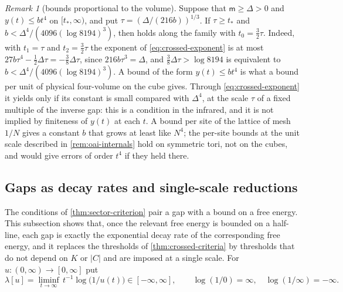 \documentclass[11pt,a4paper]{amsart}
\theoremstyle{definition}
\theoremstyle{remark}
\newtheorem{remark}[theorem]{Remark}
\numberwithin{equation}{section}
\newcommand{\abs}[1]{\lvert #1\rvert}      %
\newcommand{\Mcirc}{\text{\upshape(M$^{\circ}$)}}   %
\newcommand{\tzero}{t_0}                   %
\begin{document}
\begin{remark}[bounds proportional to the volume]\label{rem:volume-bounds}
Suppose that $\mathsf m\ge\Delta>0$ and $y(t)\le bt^4$ on $[t_*,\infty)$, and put $\tau=(\Delta/(216b))^{1/3}$. If $\tau\ge t_*$ and $b<\Delta^4/(4096(\log8194)^3)$, then \Mcirc{} holds along the family with $\tzero=\frac32\tau$. Indeed, with $t_1=\tau$ and $t_2=\frac32\tau$ the exponent of \eqref{eq:crossed-exponent} is at most $27b\tau^4-\frac12\Delta\tau=-\frac38\Delta\tau$, since $216b\tau^3=\Delta$, and $\frac38\Delta\tau>\log8194$ is equivalent to $b<\Delta^4/(4096(\log8194)^3)$. A bound of the form $y(t)\le bt^4$ is what a bound per unit of physical four-volume on the cube gives. Through \eqref{eq:crossed-exponent} it yields \Mcirc{} only if its constant is small compared with $\Delta^4$, at the scale $\tau$ of a fixed multiple of the inverse gap: this is a condition in the infrared, and it is not implied by finiteness of $y(t)$ at each $t$. A bound per site of the lattice of mesh $1/N$ gives a constant $b$ that grows at least like $N^4$; the per-site bounds at the unit scale described in \cref{rem:oai-internals} hold on symmetric tori, not on the cubes, and would give errors of order $t^4$ if they held there.
\end{remark}

\subsection{Gaps as decay rates and single-scale reductions}

The conditions of \cref{thm:sector-criterion} pair a gap with a bound on a free energy. This subsection shows that, once the relevant free energy is bounded on a half-line, each gap is exactly the exponential decay rate of the corresponding free energy, and it replaces the thresholds of \cref{thm:crossed-criteria} by thresholds that do not depend on $K$ or $\abs{C}$ and are imposed at a single scale. For $u:(0,\infty)\to[0,\infty]$ put
\[
\lambda[u]=\liminf_{t\to\infty}\,t^{-1}\log\bigl(1/u(t)\bigr)\in[-\infty,\infty],\qquad \log(1/0)=\infty,\quad \log(1/\infty)=-\infty .
\]
\end{document}
